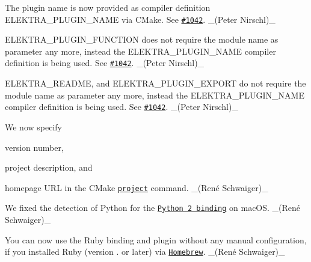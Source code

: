 \begin{DoxyItemize}
\item The plugin name is now provided as compiler definition {\ttfamily E\+L\+E\+K\+T\+R\+A\+\_\+\+P\+L\+U\+G\+I\+N\+\_\+\+N\+A\+ME} via C\+Make. See \href{https://issues.libelektra.org/1042}{\tt \#1042}. \+\_\+(\+Peter Nirschl)\+\_\+
\item {\ttfamily E\+L\+E\+K\+T\+R\+A\+\_\+\+P\+L\+U\+G\+I\+N\+\_\+\+F\+U\+N\+C\+T\+I\+ON} does not require the module name as parameter any more, instead the {\ttfamily E\+L\+E\+K\+T\+R\+A\+\_\+\+P\+L\+U\+G\+I\+N\+\_\+\+N\+A\+ME} compiler definition is being used. See \href{https://issues.libelektra.org/1042}{\tt \#1042}. \+\_\+(\+Peter Nirschl)\+\_\+
\item {\ttfamily E\+L\+E\+K\+T\+R\+A\+\_\+\+R\+E\+A\+D\+ME}, and {\ttfamily E\+L\+E\+K\+T\+R\+A\+\_\+\+P\+L\+U\+G\+I\+N\+\_\+\+E\+X\+P\+O\+RT} do not require the module name as parameter any more, instead the {\ttfamily E\+L\+E\+K\+T\+R\+A\+\_\+\+P\+L\+U\+G\+I\+N\+\_\+\+N\+A\+ME} compiler definition is being used. See \href{https://issues.libelektra.org/1042}{\tt \#1042}. \+\_\+(\+Peter Nirschl)\+\_\+
\item We now specify
\begin{DoxyItemize}
\item version number,
\item project description, and
\item homepage U\+RL in the C\+Make \href{https://cmake.org/cmake/help/latest/command/project.html}{\tt {\ttfamily project}} command. \+\_\+(René Schwaiger)\+\_\+
\end{DoxyItemize}
\item We fixed the detection of Python for the \href{https://www.libelektra.org/bindings/swig_python2}{\tt Python 2 binding} on mac\+OS. \+\_\+(René Schwaiger)\+\_\+
\item You can now use the Ruby binding and plugin without any manual configuration, if you installed Ruby (version {.} or later) via \href{http://brew.sh}{\tt Homebrew}. \+\_\+(René Schwaiger)\+\_\+
\end{DoxyItemize}



